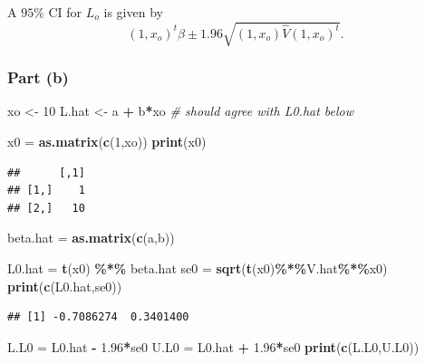 \documentclass[
  11pt,
]{article}
\newenvironment{Shaded}{\begin{snugshade}}{\end{snugshade}}
\newcommand{\CommentTok}[1]{\textcolor[rgb]{0.56,0.35,0.01}{\textit{#1}}}
\newcommand{\DecValTok}[1]{\textcolor[rgb]{0.00,0.00,0.81}{#1}}
\newcommand{\FloatTok}[1]{\textcolor[rgb]{0.00,0.00,0.81}{#1}}
\newcommand{\FunctionTok}[1]{\textcolor[rgb]{0.13,0.29,0.53}{\textbf{#1}}}
\newcommand{\NormalTok}[1]{#1}
\newcommand{\OtherTok}[1]{\textcolor[rgb]{0.56,0.35,0.01}{#1}}
\newcommand{\SpecialCharTok}[1]{\textcolor[rgb]{0.81,0.36,0.00}{\textbf{#1}}}
\begin{document}
A \(95\%\) CI for \(L_o\) is given by \[
  (1,x_o)^t \beta \pm 1.96 \sqrt{(1,x_o) \hat{V} (1,x_o)^t}.
\]

\hypertarget{part-b-3}{%
\subsubsection{Part (b)}\label{part-b-3}}


\begin{Shaded}
\begin{Highlighting}[]
\NormalTok{xo }\OtherTok{\textless{}{-}} \DecValTok{10}
\NormalTok{L.hat }\OtherTok{\textless{}{-}}\NormalTok{ a }\SpecialCharTok{+}\NormalTok{ b}\SpecialCharTok{*}\NormalTok{xo }\CommentTok{\# should agree with L0.hat below}

\NormalTok{x0 }\OtherTok{=} \FunctionTok{as.matrix}\NormalTok{(}\FunctionTok{c}\NormalTok{(}\DecValTok{1}\NormalTok{,xo))}
\FunctionTok{print}\NormalTok{(x0)}
\end{Highlighting}
\end{Shaded}

\begin{verbatim}
##      [,1]
## [1,]    1
## [2,]   10
\end{verbatim}

\begin{Shaded}
\begin{Highlighting}[]
\NormalTok{beta.hat }\OtherTok{=} \FunctionTok{as.matrix}\NormalTok{(}\FunctionTok{c}\NormalTok{(a,b))}

\NormalTok{L0.hat }\OtherTok{=} \FunctionTok{t}\NormalTok{(x0) }\SpecialCharTok{\%*\%}\NormalTok{ beta.hat}
\NormalTok{se0 }\OtherTok{=} \FunctionTok{sqrt}\NormalTok{(}\FunctionTok{t}\NormalTok{(x0)}\SpecialCharTok{\%*\%}\NormalTok{V.hat}\SpecialCharTok{\%*\%}\NormalTok{x0)}
\FunctionTok{print}\NormalTok{(}\FunctionTok{c}\NormalTok{(L0.hat,se0))}
\end{Highlighting}
\end{Shaded}

\begin{verbatim}
## [1] -0.7086274  0.3401400
\end{verbatim}

\begin{Shaded}
\begin{Highlighting}[]
\NormalTok{L.L0 }\OtherTok{=}\NormalTok{ L0.hat }\SpecialCharTok{{-}} \FloatTok{1.96}\SpecialCharTok{*}\NormalTok{se0}
\NormalTok{U.L0 }\OtherTok{=}\NormalTok{ L0.hat }\SpecialCharTok{+} \FloatTok{1.96}\SpecialCharTok{*}\NormalTok{se0}
\FunctionTok{print}\NormalTok{(}\FunctionTok{c}\NormalTok{(L.L0,U.L0))}
\end{Highlighting}
\end{Shaded}
\end{document}
